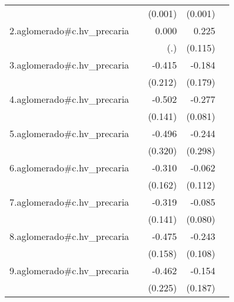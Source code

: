 {\begin{longtable}{l*{4}{D{.}{.}{-1}}}
            &                     &     (0.001)         &     (0.001)         &                     \\
\addlinespace
2.aglomerado#c.hv\_precaria&                     &       0.000         &       0.225\sym{*}  &                     \\
            &                     &         (.)         &     (0.115)         &                     \\
\addlinespace
3.aglomerado#c.hv\_precaria&                     &      -0.415         &      -0.184         &                     \\
            &                     &     (0.212)         &     (0.179)         &                     \\
\addlinespace
4.aglomerado#c.hv\_precaria&                     &      -0.502\sym{***}&      -0.277\sym{***}&                     \\
            &                     &     (0.141)         &     (0.081)         &                     \\
\addlinespace
5.aglomerado#c.hv\_precaria&                     &      -0.496         &      -0.244         &                     \\
            &                     &     (0.320)         &     (0.298)         &                     \\
\addlinespace
6.aglomerado#c.hv\_precaria&                     &      -0.310         &      -0.062         &                     \\
            &                     &     (0.162)         &     (0.112)         &                     \\
\addlinespace
7.aglomerado#c.hv\_precaria&                     &      -0.319\sym{*}  &      -0.085         &                     \\
            &                     &     (0.141)         &     (0.080)         &                     \\
\addlinespace
8.aglomerado#c.hv\_precaria&                     &      -0.475\sym{**} &      -0.243\sym{*}  &                     \\
            &                     &     (0.158)         &     (0.108)         &                     \\
\addlinespace
9.aglomerado#c.hv\_precaria&                     &      -0.462\sym{*}  &      -0.154         &                     \\
            &                     &     (0.225)         &     (0.187)         &                     \\

\end{longtable}}
